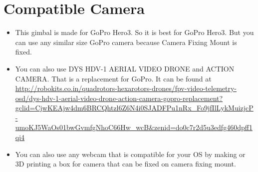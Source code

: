 \documentclass[11pt,a4paper]{article}
\begin{document}
	\section{Compatible Camera}
		\begin{itemize}
			\item This gimbal is made for GoPro Hero3. So it is best for GoPro Hero3. But you can use any similar size GoPro camera because Camera Fixing Mount is fixed.
			\item You can also use DYS HDV-1 AERIAL VIDEO DRONE and ACTION CAMERA. That is a replacement for GoPro. It can be found at
			\newline
			\url{http://robokits.co.in/quadrotors-hexarotors-drones/fpv-video-telemetry-osd/dys-hdv-1-aerial-video-drone-action-camera-gopro-replacement?gclid=CjwKEAjw4dm6BRCQhtzl6Z6N4i0SJADFPu1nRx_Fo9jfIlLykMuizjcP-umoKJ5WaOs01bwGvmfgNhoC66Hw_wcB\&zenid=do0c7r2d5u3edfg460dpff1qi4}
			\item You can also use any webcam that is compatible for your OS by making or 3D printing a box for camera that can be fixed on camera fixing mount.
		\end{itemize}
\end{document}
